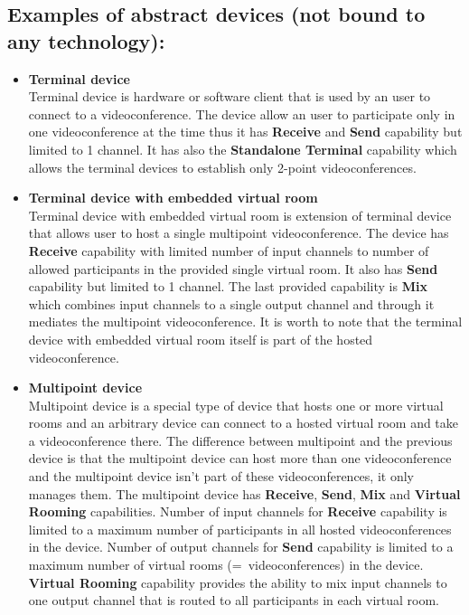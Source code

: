 \documentclass[a4paper]{report}
\begin{document}
\subsection*{Examples of abstract devices (not bound to any technology):}
\begin{itemize}
\item \textbf{Terminal device} \\
  Terminal device is hardware or software client that is used by an user to 
  connect to a videoconference. The device allow an user to participate only in
  one videoconference at the time thus it has \textbf{Receive} and 
  \textbf{Send} capability but limited to 1 channel. It has also the 
  \textbf{Standalone Terminal} capability which allows the terminal devices to  
  establish only 2-point videoconferences. 

\item \textbf{Terminal device with embedded virtual room} \\
  Terminal device with embedded virtual room is extension of terminal device 
  that allows user to host a single multipoint videoconference. The device has 
  \textbf{Receive} capability with limited number of input channels to number 
  of allowed participants in the provided single virtual room. It also has 
  \textbf{Send} capability but limited to 1 channel. The last provided 
  capability is \textbf{Mix} which combines input channels to a single output 
  channel and through it mediates the multipoint videoconference. It is worth 
  to note that the terminal device with embedded virtual room itself is part of 
  the hosted videoconference.

\item \textbf{Multipoint device} \\
  Multipoint device is a special type of device that hosts one or more virtual 
  rooms and an arbitrary device can connect to a hosted virtual room and take 
  a videoconference there. The difference between multipoint and the previous 
  device is that the multipoint device can host more than one videoconference 
  and the multipoint device isn't part of these videoconferences, it only 
  manages them. The multipoint device has \textbf{Receive}, \textbf{Send},
  \textbf{Mix} and \textbf{Virtual Rooming} capabilities. Number of input 
  channels for \textbf{Receive} capability is limited to a maximum number of 
  participants in all hosted videoconferences in the device. Number of output 
  channels for \textbf{Send} capability is limited to a maximum number of 
  virtual rooms (=~videoconferences) in the device. \textbf{Virtual Rooming} 
  capability provides the ability to mix input channels to one output channel 
  that is routed to all participants in each virtual room.


\end{itemize}
\end{document}
